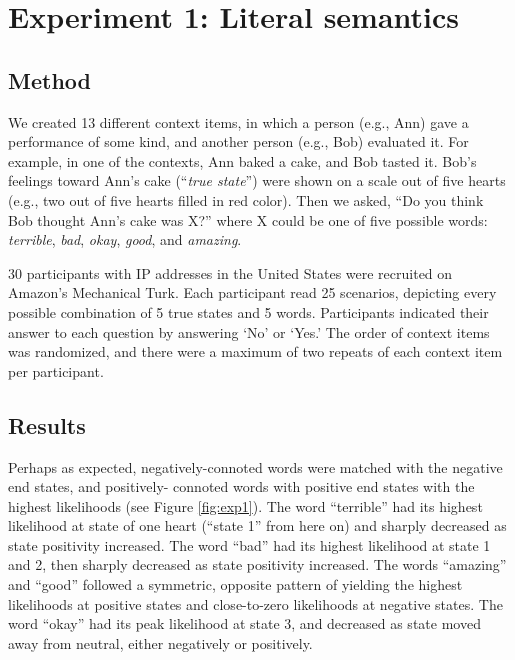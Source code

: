 \documentclass[10pt,letterpaper]{article}
\begin{document}
%



\section{Experiment 1: Literal semantics}

\subsection{Method}

We created 13 different context items, in which a person (e.g., Ann) gave a performance of some kind, and another person (e.g., Bob) evaluated it. For example, in one of the contexts, Ann baked a cake, and Bob tasted it. Bob's feelings toward Ann's cake (``\emph{true state}'') were shown on a scale out of five hearts (e.g., two out of five hearts filled in red color). Then we asked, ``Do you think Bob thought Ann's cake was X?'' where X could be one of five possible words: \emph{terrible}, \emph{bad}, \emph{okay}, \emph{good}, and \emph{amazing}.

30 participants with IP addresses in the United States were recruited on Amazon's Mechanical Turk. Each participant read 25 scenarios, depicting every possible combination of 5 true states and 5 words. Participants indicated their answer to each question by answering `No' or `Yes.' The order of context items was randomized, and there were a maximum of two repeats of each context item per participant.

\subsection{Results}

Perhaps as expected, negatively-connoted words were matched with the negative end states, and positively- connoted words with positive end states with the highest likelihoods (see Figure \ref{fig:exp1}). The word ``terrible'' had its highest likelihood at state of one heart (``state 1'' from here on) and sharply decreased as state positivity increased. The word ``bad'' had its highest likelihood at state 1 and 2, then sharply decreased as state positivity increased. The words ``amazing'' and ``good'' followed a symmetric, opposite pattern of yielding the highest likelihoods at positive states and close-to-zero likelihoods at negative states. The word ``okay'' had its peak likelihood at state 3, and decreased as state moved away from neutral, either negatively or positively.
\end{document}
